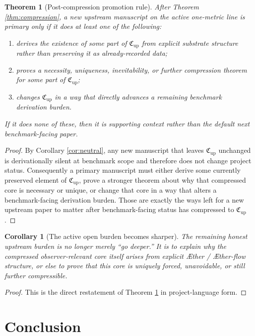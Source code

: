 \documentclass[11pt]{article}
\newcommand{\Aether}{\AE{}ther}
\newcommand{\Aflow}{\AE{}ther-flow}
\newcommand{\CompressionData}{\mathfrak C_{\mathrm{up}}}
\newtheorem{corollary}{Corollary}
\newtheorem{theorem}{Theorem}
\begin{document}
\begin{theorem}[Post-compression promotion rule]
\label{thm:promotion}
After Theorem \ref{thm:compression}, a new upstream manuscript on the active one-metric line is primary only if it does at least one of the following:
\begin{enumerate}
    \item derives the existence of some part of \(\CompressionData\) from explicit substrate structure rather than preserving it as already-recorded data;
    \item proves a necessity, uniqueness, inevitability, or further compression theorem for some part of \(\CompressionData\);
    \item changes \(\CompressionData\) in a way that directly advances a remaining benchmark derivation burden.
\end{enumerate}
If it does none of these, then it is supporting context rather than the default next benchmark-facing paper.
\end{theorem}

\begin{proof}
By Corollary \ref{cor:neutral}, any new manuscript that leaves \(\CompressionData\) unchanged is derivationally silent at benchmark scope and therefore does not change project status. Consequently a primary manuscript must either derive some currently preserved element of \(\CompressionData\), prove a stronger theorem about why that compressed core is necessary or unique, or change that core in a way that alters a benchmark-facing derivation burden. Those are exactly the ways left for a new upstream paper to matter after benchmark-facing status has compressed to \(\CompressionData\).
\end{proof}

\begin{corollary}[The active open burden becomes sharper]
The remaining honest upstream burden is no longer merely ``go deeper.'' It is to explain why the compressed observer-relevant core itself arises from explicit \Aether{} / \Aflow{} structure, or else to prove that this core is uniquely forced, unavoidable, or still further compressible.
\end{corollary}

\begin{proof}
This is the direct restatement of Theorem \ref{thm:promotion} in project-language form.
\end{proof}

\section{Conclusion}
\end{document}
